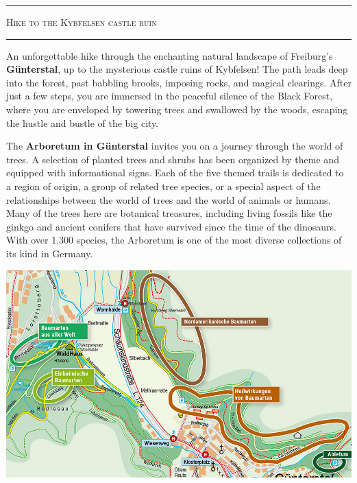 \documentclass[landscape, a4paper]{article}
\newcommand\alert[1]{\textcolor{PrimaryColor}{\textbf{#1}}}
\begin{document}
\noindent
\centering
\footnotesize
\begin{minipage}[t]{0.31\textwidth}
	\setlength{\parskip}{0.25cm}

	\vspace{0.5cm}

		\textcolor{PrimaryColor}{
			\rule{\linewidth}{0.5mm}
			\vspace{-0.1cm}
			\begin{center}
				\large
				\textsc{Hike to the Kybfelsen castle ruin}
			\end{center}
			\rule{\linewidth}{0.5mm}
		}

    An unforgettable hike through the enchanting natural landscape of Freiburg's \alert{Günterstal}, up to the mysterious castle ruins of Kybfelsen! The path leads deep into the forest, past babbling brooks, imposing rocks, and magical clearings. After just a few steps, you are immersed in the peaceful silence of the Black Forest, where you are enveloped by towering trees and swallowed by the woods, escaping the hustle and bustle of the big city.

    The \alert{Arboretum in Günterstal} invites you on a journey through the world of trees. A selection of planted trees and shrubs has been organized by theme and equipped with informational signs. Each of the five themed trails is dedicated to a region of origin, a group of related tree species, or a special aspect of the relationships between the world of trees and the world of animals or humans.
    Many of the trees here are botanical treasures, including living fossils like the ginkgo and ancient conifers that have survived since the time of the dinosaurs. With over 1,300 species, the Arboretum is one of the most diverse collections of its kind in Germany.

		\includegraphics[width=\linewidth]{./figures/arboretum.png}
		\setlength{\parskip}{0.25cm}


\end{minipage}
\end{document}
